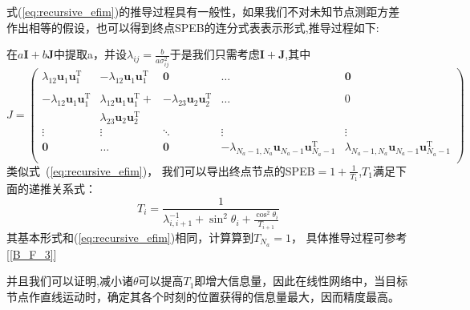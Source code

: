 式(\ref{eq:recursive_efim})的推导过程具有一般性，如果我们不对未知节点测距方差作出相等的假设，也可以得到终点SPEB的连分式表表示形式,推导过程如下:

在$a\bm{I}+b\bm{J}$中提取a，并设$\lambda_{ij}=\frac{b}{a\sigma_{ij}^2}$于是我们只需考虑$\bm{I}+\bm{J}$,其中
\[J=\left(
\begin{array}{ccccc}
\lambda_{12}\bm{u}_1\bm{u}_1^{\textrm{T}} &-\lambda_{12}\bm{u}_1\bm{u}_1^{\textrm{T}} &\bm{0}&\dots&\bm{0}\\
&&&&\\
-\lambda_{12}\bm{u}_1\bm{u}_1^{\textrm{T}} &\lambda_{12}\bm{u}_1\bm{u}_1^{\textrm{T}} +&-\lambda_{23}\bm{u}_2\bm{u}_2^{\textrm{T}} &\dots&0\\
&\lambda_{23}\bm{u}_2\bm{u}_2^{\textrm{T}} &&&\\
\vdots &\vdots&\ddots &\vdots&\vdots\\
\bm{0}&\dots&\bm{0}&-\lambda_{N_a-1,N_a}\bm{u}_{N_a-1}\bm{u}_{N_a-1}^{\textrm{T}} &\lambda_{N_a-1,N_a}\bm{u}_{N_a-1}\bm{u}_{N_a-1}^{\textrm{T}} \\
\end{array}
\right)
\]
类似式~(\ref{eq:recursive_efim})，
我们可以导出终点节点的SPEB$=1+\frac{1}{T_1}$,$T_1$满足下面的递推关系式：
\begin{equation}\label{eq:recursive_efim_second}
  T_i=\frac{1}{\lambda_{i,i+1}^{-1}+\sin^2\theta_i+\frac{\cos^2\theta_i}{T_{i+1}}}
\end{equation}
其基本形式和(\ref{eq:recursive_efim})相同，计算算到$T_{N_a}=1$，
具体推导过程可参考[\ref{B_F_3}]

并且我们可以证明,减小诸$\theta$可以提高$T_1$即增大信息量，因此在线性网络中，当目标节点作直线运动时，确定其各个时刻的位置获得的信息量最大，因而精度最高。
